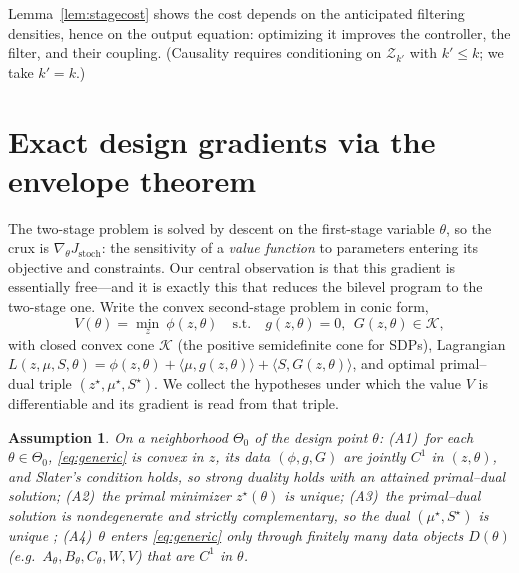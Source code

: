 \documentclass[twocolumn,amsthm]{autart}
\newtheorem{assumption}{Assumption}
\begin{document}
Lemma~\ref{lem:stagecost} shows the cost depends on the anticipated filtering
densities, hence on the output equation: optimizing it improves the controller,
the filter, and their coupling. (Causality requires conditioning on
$\mathcal{Z}_{k'}$ with $k' \le k$; we take $k' = k$.)

\section{Exact design gradients via the envelope theorem}\label{sec:envelope}

The two-stage problem is solved by descent on the first-stage variable $\theta$,
so the crux is $\nabla_\theta J_{\mathrm{stoch}}$: the sensitivity of a
\emph{value function} to parameters entering its objective and constraints. Our
central observation is that this gradient is essentially free---and it is exactly
this that reduces the bilevel program to the two-stage one. Write the convex
second-stage problem in conic form,
\begin{equation}\label{eq:generic}
V(\theta) = \min_{z}\ \phi(z,\theta)\quad \text{s.t.}\quad g(z,\theta)=0,\ \
G(z,\theta) \in \mathcal{K},
\end{equation}
with closed convex cone $\mathcal{K}$ (the positive semidefinite cone for SDPs),
Lagrangian $L(z,\mu,S,\theta) = \phi(z,\theta) + \langle \mu, g(z,\theta)\rangle
+ \langle S, G(z,\theta)\rangle$, and optimal primal--dual triple
$(z^\star,\mu^\star,S^\star)$. We collect the hypotheses under which the value
$V$ is differentiable and its gradient is read from that triple.

\begin{assumption}\label{as:env}
On a neighborhood $\Theta_0$ of the design point $\theta$:
\emph{(A1)}~for each $\theta\in\Theta_0$, \eqref{eq:generic} is convex in $z$,
its data $(\phi,g,G)$ are jointly $C^1$ in $(z,\theta)$, and Slater's condition
holds, so strong duality holds with an attained primal--dual solution;
\emph{(A2)}~the primal minimizer $z^\star(\theta)$ is unique;
\emph{(A3)}~the primal--dual solution is \emph{nondegenerate} and strictly
complementary, so the dual $(\mu^\star,S^\star)$ is unique
\cite{alizadeh1997complementarity,shapiro1997differentiability};
\emph{(A4)}~$\theta$ enters \eqref{eq:generic} only through finitely many data
objects $D(\theta)$ (e.g.\ $A_\theta,B_\theta,C_\theta,W,V$) that are $C^1$
in $\theta$.
\end{assumption}
\end{document}
